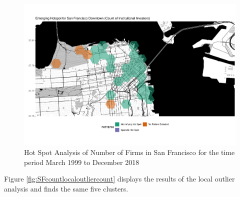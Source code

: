 \begin{figure}
	\centering
	\includegraphics[width=1\linewidth]{Figures/ChapterIV/SF_Count_EH_Downtown}
	\caption[Hot Spot Analysis of Number of Firms in Downtown San Francisco 1999-2018]{Hot Spot Analysis of Number of Firms in San Francisco for the time period March 1999 to December 2018}
	\label{fig:SFcounthotspot_Downtown}
\end{figure}

Figure \ref{fig:SFcountlocaloutliercount} displays the results of the local outlier analysis and finds the same five clusters.     

